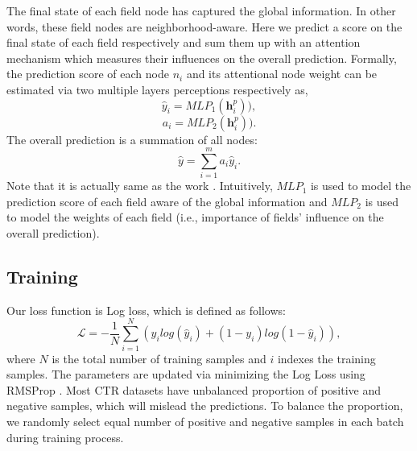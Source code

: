 \documentclass[sigconf]{acmart}
\begin{document}
The final state of each field node has captured the global information. In other words, these field nodes are neighborhood-aware. 
Here we predict a score on the final state of each field respectively and sum them up with an attention mechanism which measures their influences on the overall prediction.
Formally, the prediction score of each node $n_{i}$ and its attentional node weight can be estimated via two multiple layers perceptions respectively as,
\begin{equation} \label{self_attention1}
\hat{y}_{i} = MLP_{1}(\mathbf{h}_{i}^{p})),
\end{equation}
\begin{equation} \label{self_attention2}
a_{i} = MLP_{2}(\mathbf{h}_{i}^{p})).
\end{equation}
The overall prediction is a summation of all nodes:
\begin{equation} \label{self_attention}
\hat{y} = \sum_{i=1}^{m}a_{i}\hat{y}_{i}.
\end{equation}
Note that it is actually same as the work \cite{li2015gated}.
Intuitively, $MLP_{1}$ is used to model the prediction score of each field aware of the global information and $MLP_{2}$ is used to model the weights of each field (i.e., importance of fields' influence on the overall prediction).




\subsection{Training}
Our loss function is Log loss, which is defined as follows:
\begin{equation}
\mathcal{L} = -\frac{1}{N} \sum_{i=1}^{N}(y_{i}log(\hat{y}_{i})+(1-y_{i})log(1-\hat{y}_{i})),
\end{equation} \label{eqa:logloss}
where $N$ is the total number of training samples and $i$ indexes the training samples.
The parameters are updated via minimizing the Log Loss using RMSProp \cite{tieleman2012lecture}.
Most CTR datasets have unbalanced proportion of positive and negative samples, which will mislead the predictions.
To balance the proportion, we randomly select
 equal number of positive and negative samples in each batch during training process.
 
\end{document}
